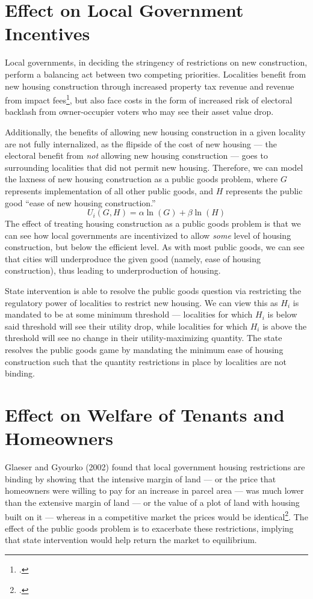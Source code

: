 \documentclass[12pt]{extarticle}
\newlength\tindent
\renewcommand{\indent}{\hspace*{\tindent}}
\begin{document}
  \section*{Effect on Local Government Incentives}%
  Local governments, in deciding the stringency of restrictions on new construction, perform a balancing act between two competing priorities. Localities benefit from new housing construction through increased property tax revenue and revenue from impact fees\footcite{impact_fees}, but also face costs in the form of increased risk of electoral backlash from owner-occupier voters who may see their asset value drop.

  \indent Additionally, the benefits of allowing new housing construction in a given locality are not fully internalized, as the flipside of the cost of new housing --- the electoral benefit from \textit{not} allowing new housing construction --- goes to surrounding localities that did not permit new housing. Therefore, we can model the laxness of new housing construction as a public goods problem, where $G$ represents implementation of all other public goods, and $H$ represents the public good ``ease of new housing construction.''
  \[U_i(G,H) = \alpha \ln(G) + \beta \ln(H)\]
  \indent The effect of treating housing construction as a public goods problem is that we can see how local governments are incentivized to allow \textit{some} level of housing construction, but below the efficient level. As with most public goods, we can see that cities will underproduce the given good (namely, ease of housing construction), thus leading to underproduction of housing.

  \indent State intervention is able to resolve the public goods question via restricting the regulatory power of localities to restrict new housing. We can view this as $H_i$ is mandated to be at some minimum threshold --- localities for which $H_i$ is below said threshold will see their utility drop, while localities for which $H_i$ is above the threshold will see no change in their utility-maximizing quantity. The state resolves the public goods game by mandating the minimum ease of housing construction such that the quantity restrictions in place by localities are not binding.
  \section*{Effect on Welfare of Tenants and Homeowners}%
  Glaeser and Gyourko (2002) found that local government housing restrictions are binding by showing that the intensive margin of land --- or the price that homeowners were willing to pay for an increase in parcel area --- was much lower than the extensive margin of land --- or the value of a plot of land with housing built on it --- whereas in a competitive market the prices would be identical\footcite{glaeser_gyourko_2002}. The effect of the public goods problem is to exacerbate these restrictions, implying that state intervention would help return the market to equilibrium.
\end{document}
